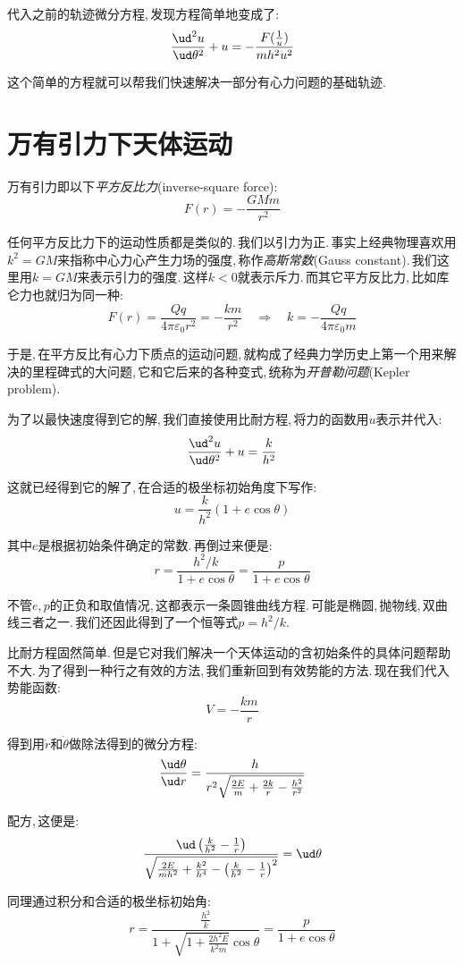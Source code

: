 代入之前的轨迹微分方程,\,发现方程简单地变成了:
\[\frac{\ud^2 u}{\ud \theta^2}+u=-\frac{F(\frac{1}{u})}{mh^2u^2}\]

这个简单的方程就可以帮我们快速解决一部分有心力问题的基础轨迹.

\section{万有引力下天体运动}

万有引力即以下\emph{平方反比力}(inverse-square force):
\[F(r)=-\frac{GMm}{r^2}\]

任何平方反比力下的运动性质都是类似的.\,我们以引力为正.\,事实上经典物理喜欢用$k^2=GM$来指称中心力心产生力场的强度,\,称作\emph{高斯常数}(Gauss constant).\,我们这里用$k=GM$来表示引力的强度.\,这样$k<0$就表示斥力.\,而其它平方反比力,\,比如库仑力也就归为同一种:
\[F(r)=\frac{Qq}{4\pi \varepsilon_0 r^2}=-\frac{km}{r^2}\quad\Rightarrow \quad k=-\frac{Qq}{4\pi\varepsilon_0 m}\]

于是,\,在平方反比有心力下质点的运动问题,\,就构成了经典力学历史上第一个用来解决的里程碑式的大问题,\,它和它后来的各种变式,\,统称为\emph{开普勒问题}(Kepler problem).

为了以最快速度得到它的解,\,我们直接使用比耐方程,\,将力的函数用$u$表示并代入:
\[\frac{\ud^2 u}{\ud \theta^2}+u=\frac{k}{h^2}\]

这就已经得到它的解了,\,在合适的极坐标初始角度下写作:
\[u=\frac{k}{h^2}(1+e\cos\theta)\]

其中$e$是根据初始条件确定的常数.\,再倒过来便是:
\[r=\frac{h^2/k}{1+e\cos\theta}=\frac{p}{1+e\cos\theta}\]

不管$e$,\,$p$的正负和取值情况,\,这都表示一条圆锥曲线方程.\,可能是椭圆,\,抛物线,\,双曲线三者之一.\,我们还因此得到了一个恒等式$p=h^2/k$.

\vspace{1cm}

比耐方程固然简单.\,但是它对我们解决一个天体运动的含初始条件的具体问题帮助不大.\,为了得到一种行之有效的方法,\,我们重新回到有效势能的方法.\,现在我们代入势能函数:
\[V=-\frac{km}{r}\]

得到用$\dot{r}$和$\dot{\theta}$做除法得到的微分方程:
\[\frac{\ud \theta}{\ud r}=\frac{h}{r^2\sqrt{\frac{2E}{m}+\frac{2k}{r}-\frac{h^2}{r^2}}}\]

配方,\,这便是:
\[\frac{\ud\left(\frac{k}{h^2}-\frac{1}{r}\right)}{\sqrt{\frac{2E}{mh^2}+\frac{k^2}{h^4}-\left(\frac{k}{h^2}-\frac{1}{r}\right)^2}}=\ud\theta\]

同理通过积分和合适的极坐标初始角:
\[r=\frac{\frac{h^2}{k}}{1+\sqrt{1+\frac{2h^2E}{k^2m}}\cos\theta}=\frac{p}{1+e\cos\theta}\]

